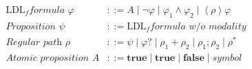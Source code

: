 \documentclass[preview=true]{standalone}
\newcommand{\LDL}{\text{LDL}_{f}}
\newcommand{\eventually}[1]{\left<#1\right>}
\begin{document}
\begin{table}[t]
\begin{align*}
\LDL \textit{formula }
  \varphi &::=
  A
  \mid \neg\varphi
  \mid \varphi_1 \land \varphi_2
  \mid \eventually{\rho}\varphi
\\
\textit{Proposition }
  \psi &::= \LDL \textit{formula w/o modality}
\\
\textit{Regular path }
\rho &::=
  \psi
  \mid \varphi?
  \mid \rho_1 + \rho_2
  \mid \rho_1; \rho_2
  \mid \rho^\ast
  \\
\textit{Atomic proposition }
A &::=
  \textbf{true}
  \mid \textbf{true}
  \mid \textbf{false}
  \mid \textit{symbol}
\end{align*}
\end{table}
\smallskip
\end{document}

